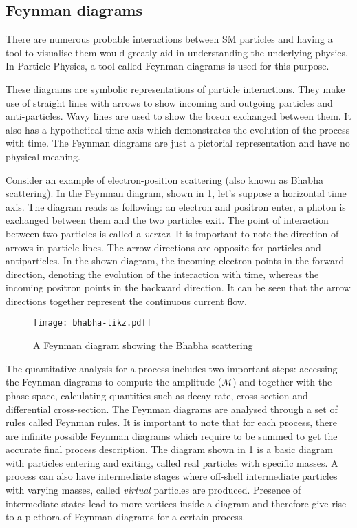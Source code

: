 \subsection{Feynman diagrams}

There are numerous probable interactions between SM particles and having a tool to visualise them
would greatly aid in understanding the underlying physics. In Particle Physics, a tool called Feynman
diagrams is used for this purpose. 

These diagrams are symbolic representations of particle interactions. They make use of straight lines 
with arrows to show incoming and outgoing particles and anti-particles. Wavy lines are used to show
the boson exchanged between them. It also has a hypothetical time axis which demonstrates the
evolution of the process with time. The Feynman diagrams are just a pictorial representation and have no 
physical meaning. 

Consider an example of electron-position scattering (also known as Bhabha scattering). In the Feynman diagram,
shown in \cref{fig:bhabha}, let's suppose a horizontal time axis. The diagram reads as following:
an electron and positron enter, a photon is exchanged between them and the two particles exit. The point of
interaction between two particles is called a \textit{vertex}.
It is important to note the direction of arrows in particle lines. The arrow directions are opposite 
for particles and antiparticles. 
In the shown diagram, the incoming electron points in the forward direction, denoting the 
evolution of the interaction with time, whereas the incoming positron points in the backward direction.
It can be seen that the arrow directions together represent the continuous current flow. 


\begin{figure}[htbp]
    \centering
    \texttt{[image: bhabha-tikz.pdf]}
    \caption[Sketch of the ATLAS calorimeters]{A Feynman diagram showing the Bhabha scattering}%
    \label{fig:bhabha}
\end{figure}

The quantitative analysis for a process includes two important steps: accessing the Feynman diagrams to
compute the amplitude ($\mathcal{M}$) and together with the phase space, calculating quantities such as 
decay rate, cross-section and differential cross-section. The Feynman diagrams are 
analysed through a set of rules called Feynman rules. It is important to note that
for each process, there are infinite possible Feynman diagrams which require to be summed to get the 
accurate final process description. The diagram shown in \cref{fig:bhabha} is a basic diagram with particles 
entering and exiting, called real particles with specific masses. A
process can also have intermediate stages where off-shell intermediate particles
with varying masses, called \textit{virtual} particles are produced. Presence of intermediate states lead to 
more vertices inside a diagram and therefore give rise to a plethora of Feynman diagrams for a certain 
process. 

